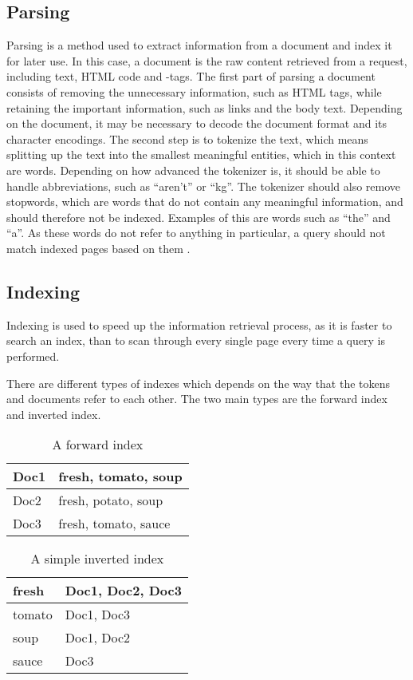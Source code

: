 \subsection{Parsing} \label{sec:parsing}
Parsing is a method used to extract information from a document and index it for
later use. In this case, a document is the raw content retrieved from a request,
including text, HTML code and -tags.
The first part of parsing a document consists of removing the unnecessary
information, such as HTML tags, while retaining the important information, such
as links and the body text. Depending on the document, it may be necessary to
decode the document format and its character encodings.
The second step is to tokenize the text, which means splitting up the text into
the smallest meaningful entities, which in this context are words. Depending on
how advanced the tokenizer is, it should be able to handle abbreviations, such
as ``aren't'' or ``kg''. The tokenizer should also remove
stopwords, which are words that do not contain any meaningful information,
and should therefore not be indexed. Examples of this are words such as ``the''
and ``a''. As these words do not refer to anything in particular, a query should
not match indexed pages based on them \citep[Ch. 2]{manning2008introduction}.

\subsection{Indexing}
Indexing is used to speed up the information retrieval process, as it is faster
to search an index, than to scan through every single page every time a query is
performed.

There are different types of indexes which depends on the way that the tokens
and documents refer to each other. The two main types are the forward index and
inverted index.

\begin{minipage}{.40\textwidth}
  \centering
  \begin{table}[H]
	\centering
    \begin{tabular}{|l|l|}
\hline
Doc1 & fresh, tomato, soup \\ \hline
Doc2 & fresh, potato, soup \\ \hline
Doc3 & fresh, tomato, sauce \\ \hline
	\end{tabular}
	\caption{A forward index}
	\label{fIndex}
  \end{table}
\end{minipage}
\begin{minipage}{0.5\textwidth}
  \centering
  \begin{table}[H]
	\centering
    \begin{tabular}{|l|l|}
\hline
fresh & Doc1, Doc2, Doc3 \\ \hline
tomato & Doc1, Doc3 \\ \hline
soup & Doc1, Doc2 \\ \hline
sauce & Doc3 \\ \hline
	\end{tabular}
	\caption{A simple inverted index}
	\label{iIndex}
  \end{table}
\end{minipage}\nl

